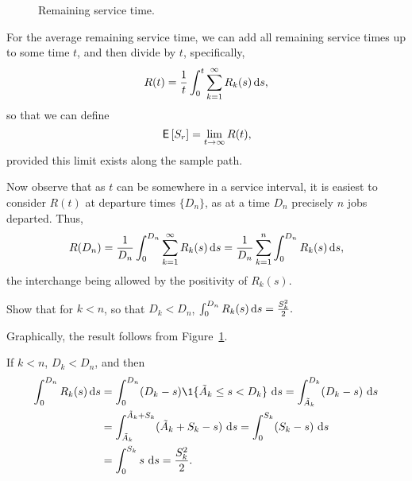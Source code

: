 \begin{figure}[ht]
  \centering
{}

  \caption{Remaining service time.}
  \label{fig:mg1remainingservicetime}
\end{figure}


For the average remaining service time, we can add all remaining
service times up to some time $t$, and then divide by $t$,
specifically,
\begin{equation*}
R(t) = \frac{1}t \int_0^t \sum_{k=1}^\infty R_k(s) \,\text{d}s,
\end{equation*}
so that we can define
\begin{equation*}
  \,\mathsf{E}\left[S_r\right] = \lim_{t\to\infty} R(t),
\end{equation*}
provided this limit exists along the sample path.

Now observe that as $t$ can be somewhere in a service interval, it is
easiest to consider $R(t)$ at departure times $\{D_n\}$, as at a time
$D_n$ precisely $n$ jobs departed. Thus,
\begin{align*}
R(D_n)
= \frac{1}{D_n} \int_0^{D_n} \sum_{k=1}^\infty R_k(s) \,\text{d}s 
= \frac{1}{D_n} \sum_{k=1}^n \int_0^{D_n}  R_k(s) \,\text{d}s,
\end{align*}
the interchange being allowed by the positivity of $R_k(s)$.  

\begin{exercise}
Show that for $k<n$, so that $D_k< D_n$,
$\int_0^{D_n} R_k(s) \,\text{d}s = \frac{S_k^2}2.$
\begin{hint}
  Graphically, the result follows from Figure~\ref{fig:mg1remainingservicetime}.   
\end{hint}
\begin{solution}
If $k<n$,  $D_k< D_n$, and then
\begin{align*}
\int_0^{D_n} R_k(s) \d s
&= \int_0^{D_n} (D_k-s)\1{\tilde A_k \leq s < D_k}\, \d s = \int_{\tilde A_k}^{D_k} (D_k-s) \, \d s \\
&= \int_{\tilde A_k}^{\tilde A_k+S_k} (\tilde A_k+S_k-s) \, \d s  = \int_{0}^{S_k} (S_k-s) \, \d s \\
&= \int_{0}^{S_k} s \, \d s = \frac{S_k^2}2.
\end{align*}
  \end{solution}
\end{exercise}

